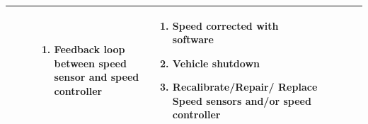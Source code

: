 \documentclass [10pt]{article}
\begin{document}
{\begin{minipage}{\textwidth}
\begin{longtable}{ |p{ }  | p{ } |  p{ } |  p{ } | p{ } | p{ } |  p{ }|}
\begin{minipage}{.18\textwidth}
\begin{enumerate}
                \end{enumerate}
        \end{minipage}
    & \begin{minipage}{.23\textwidth} 
                \vspace{2mm}
                \begin{enumerate}
                    \item Feedback loop between speed sensor and speed controller \vspace {1mm}
                \end{enumerate}
        \end{minipage}
    
    
    & \begin{minipage}{.24 \columnwidth} 
                \vspace{2mm}
                \begin{enumerate}
                    \item Speed corrected with software
                    \item Vehicle shutdown 
                    \item Recalibrate/Repair/ Replace Speed sensors and/or speed controller \vspace {1mm}
                \end{enumerate}
        \end{minipage} \\ \hline
   
    
    
   
    
     
    \end{longtable}
    
    
    
    \end{minipage}}
    
\end{document}
